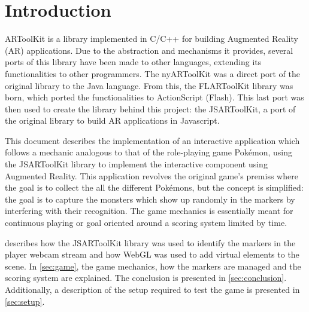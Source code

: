 \section{Introduction}
\label{sec:intro}

ARToolKit is a library implemented in C/C++ for building Augmented Reality (AR) applications. Due to the abstraction and mechanisms it provides, several ports of this library have been made to other languages, extending its functionalities to other programmers. The nyARToolKit was a direct port of the original library to the Java language. From this, the FLARToolKit library was born, which ported the functionalities to ActionScript (Flash). This last port was then used to create the library behind this project: the JSARToolKit, a port of the original library to build AR applications in Javascript.

This document describes the implementation of an interactive application which follows a mechanic analogous to that of the role-playing game Pokémon\textregistered, using the JSARToolKit library to implement the interactive component using Augmented Reality. This application revolves the original game's premiss where the goal is to collect the all the different Pokémons, but the concept is simplified: the goal is to capture the monsters which show up randomly in the markers by interfering with their recognition. The game mechanics is essentially meant for continuous playing or goal oriented around a scoring system limited by time.

 describes how the JSARToolKit library was used to identify the markers in the player webcam stream and how WebGL was used to add virtual elements to the scene. In \cref{sec:game}, the game mechanics, how the markers are managed and the scoring system are explained. The conclusion is presented in \cref{sec:conclusion}. Additionally, a description of the setup required to test the game is presented in \cref{sec:setup}.
